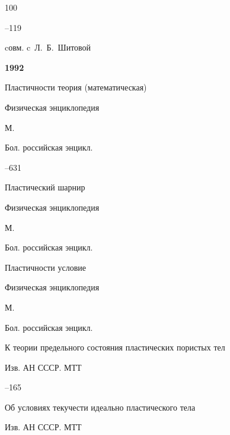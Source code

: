 \begin{thebibliography}{100}

–119 

\miscnote cовм. c~Л.~Б.~Шитовой



\item[] \centerline{\bf 1992}




\paper Пластичности теория (математическая) 

\inbook Физическая энциклопедия


\publaddr М.

\publ Бол. российская энцикл.


–631




\paper Пластический шарнир 

\inbook Физическая энциклопедия


\publaddr М.

\publ Бол. российская энцикл.






\paper Пластичности условие 

\inbook Физическая энциклопедия


\publaddr М.

\publ Бол. российская энцикл.








\paper К теории предельного состояния пластических пористых тел 

\jour Изв. АН СССР. МТТ



–165




\paper Об условиях текучести идеально пластического тела 

\jour Изв. АН СССР. МТТ


\end{thebibliography}
